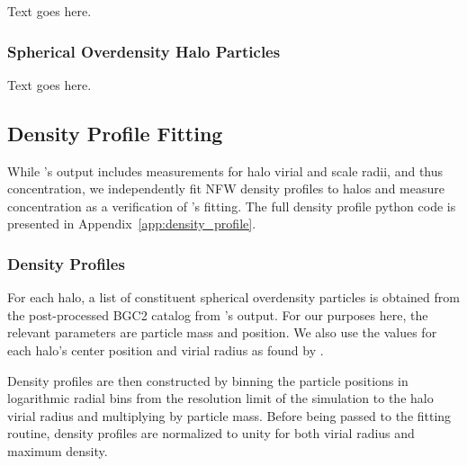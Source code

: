Text goes here.



\subsubsection{Spherical Overdensity Halo Particles}
\label{subsubsec:analysis--halo_properties--spherical_overdensity}


Text goes here.




\subsection{Density Profile Fitting}
\label{subsec:analysis--profile_fitting}


While \rockstar's output includes measurements for halo virial and scale radii, and thus concentration, we independently fit NFW density profiles to halos and measure concentration as a verification of \rockstar's fitting.  The full density profile python code is presented in Appendix~\ref{app:density_profile}.



\subsubsection{Density Profiles}
\label{subsubsec:analysis--profile_fitting--density_profiles}


For each halo, a list of constituent spherical overdensity particles is obtained from the post-processed BGC2 catalog from \rockstar's output.  For our purposes here, the relevant parameters are particle mass and position.  We also use the values for each halo's center position and virial radius as found by \rockstar.

Density profiles are then constructed by binning the particle positions in logarithmic radial bins from the resolution limit of the simulation to the halo virial radius and multiplying by particle mass.  Before being passed to the fitting routine, density profiles are normalized to unity for both virial radius and maximum density. 



